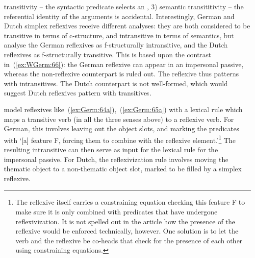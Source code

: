 \documentclass[output=paper,hidelinks]{langscibook}
\begin{document}
transitivity -- the syntactic predicate selects an \OBJ, 3) semantic
transititivity -- the referential identity of the arguments is
accidental.  Interestingly, German and Dutch simplex reflexives receive
different analyses: they are both considered to be transitive in terms
of c-structure, and intransitive in terms of semantics, but
\citeauthor{Sells1987-xz} analyse the German reflexives as f-structurally
intransitive, and the Dutch reflexives as f-structurally transitive. This
is based upon the contrast in~(\ref{ex:WGerm:66}): the German reflexive can
appear in an impersonal passive, whereas the non-reflexive counterpart
is ruled out. The reflexive thus patterns with intransitives. The
Dutch counterpart is not well-formed, which would suggest Dutch
reflexives pattern with transitives.
%
\begin{exe}
  \ex\label{ex:WGerm:66}
  \begin{xlist}
  \end{xlist}
\end{exe}
%
\citet{Sells1987-xz} model reflexives like~(\ref{ex:Germ:64a}),~(\ref{ex:Germ:65a}) with a lexical rule which maps a
transitive verb (in all the three senses above) to a reflexive
verb. For German, this involves leaving out the object slots, and 
marking the predicates with `[a] feature F, forcing them to combine
with the reflexive element.'\footnote{The reflexive itself carries a
constraining equation checking this feature F to make sure it is only
combined with predicates that have undergone reflexivization. It is
not spelled out in the article how the presence of the reflexive would
be enforced technically, however. One solution is to let
the verb and the reflexive be co-heads that check for the presence of
each other using constraining equations.} The resulting intransitive
can then serve as input for the lexical rule for the impersonal
passive. For Dutch, the reflexivization rule involves moving the
thematic object to a non-thematic object slot, marked to be filled by
a simplex reflexive.
\end{document}
